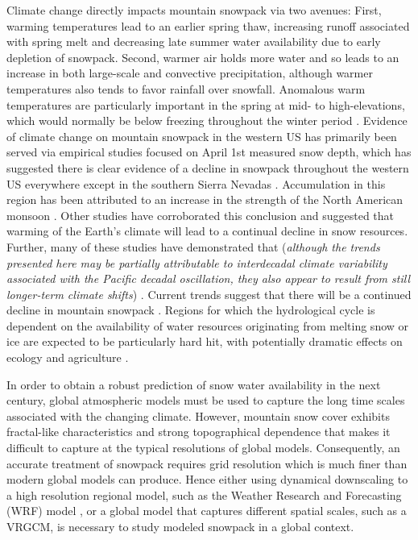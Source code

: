 \documentclass[11pt]{article}
\begin{document}
Climate change directly impacts mountain snowpack via two avenues: First, warming temperatures lead to an earlier spring thaw, increasing runoff associated with spring melt and decreasing late summer water availability due to early depletion of snowpack. Second, warmer air holds more water and so leads to an increase in both large-scale and convective precipitation, although warmer temperatures also tends to favor rainfall over snowfall. Anomalous warm temperatures are particularly important in the spring at mid- to high-elevations, which would normally be below freezing throughout the winter period \citep{cayan1996interannual,stewart2009changes}. Evidence of climate change on mountain snowpack in the western US has primarily been served via empirical studies focused on April 1st measured snow depth, which has suggested there is clear evidence of a decline in snowpack throughout the western US everywhere except in the southern Sierra Nevadas \citep{mote_declining_2005}. Accumulation in this region has been attributed to an increase in the strength of the North American monsoon \citep{dyer2006spatial}. Other studies have corroborated this conclusion \citep{dettinger1995large,mote_declining_2005,knowles2006trends} and suggested that warming of the Earth's climate will lead to a continual decline in snow resources. Further, many of these studies have demonstrated that (\textit{although the trends presented here may be partially attributable to interdecadal climate variability associated with the Pacific decadal oscillation, they also appear to result from still longer-term climate shifts}) \citep{knowles2006trends}. Current trends suggest that there will be a continued decline in mountain snowpack \citep{stewart2009changes}. Regions for which the hydrological cycle is dependent on the availability of water resources originating from melting snow or ice are expected to be particularly hard hit, with potentially dramatic effects on ecology and agriculture \citep{barnett2005potential}.

In order to obtain a robust prediction of snow water availability in the next century, global atmospheric models must be used to capture the long time scales associated with the changing climate.  However, mountain snow cover exhibits fractal-like characteristics and strong topographical dependence that makes it difficult to capture at the typical resolutions of global models. Consequently, an accurate treatment of snowpack requires grid resolution which is much finer than modern global models can produce. Hence either using dynamical downscaling to a high resolution regional model, such as the Weather Research and Forecasting (WRF) model \citep{michalakes2001development}, or a global model that captures different spatial scales, such as a VRGCM, is necessary to study modeled snowpack in a global context.
\end{document}
